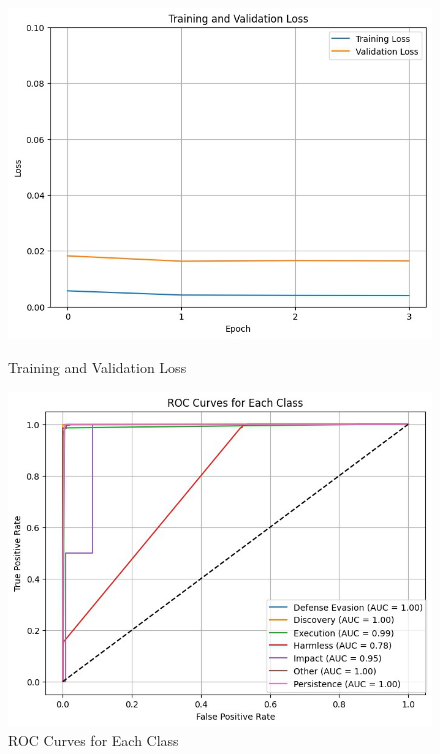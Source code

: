             \begin{figure}[h]
                \centering
                \begin{minipage}[c]{0.47\textwidth}
                    \centering
                    \includegraphics[width=\textwidth]{../figures/plots/section4/loss_curves.png}
                    \caption{Training and Validation Loss}
                    \label{fig:loss}
                \end{minipage}
                \hfill
                \begin{minipage}[c]{0.47\textwidth}
                    \centering
                    \includegraphics[width=\textwidth]{../figures/plots/section4/roc_curves.png}
                    \caption{ROC Curves for Each Class}
                    \label{fig:roc}
                \end{minipage}
            \end{figure}
            
